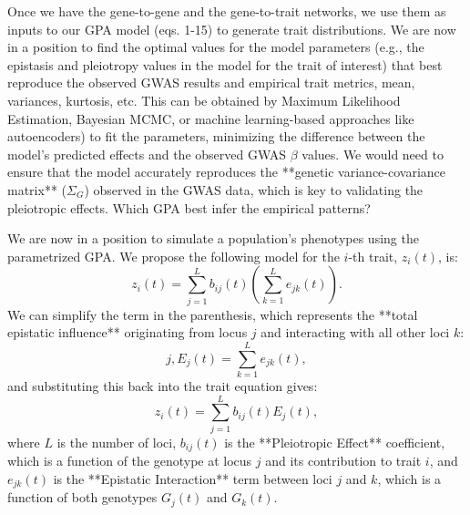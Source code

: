 \documentclass[a4paper,12pt]{elsarticle}
\begin{document}
\begin{tcolorbox}
Once we have the gene-to-gene and the gene-to-trait networks, we use them as inputs to our GPA model (eqs. 1-15) to generate trait distributions. We are now in a position to find the optimal values for the model parameters (e.g., the epistasis and pleiotropy values in the model for the trait of interest) that best reproduce the observed GWAS results and empirical trait metrics, mean, variances, kurtosis, etc. This can be obtained by Maximum Likelihood Estimation, Bayesian MCMC, or machine learning-based approaches like autoencoders) to fit the parameters, minimizing the difference between the model's predicted effects and the observed GWAS $\beta$ values. We would need to ensure that the model accurately reproduces the **genetic variance-covariance matrix** ($\Sigma_G$) observed in the GWAS data, which is key to validating the pleiotropic effects. Which GPA best infer the empirical patterns? 

We are now in a position to simulate a population's phenotypes using the parametrized GPA. We propose the following model for the $i$-th trait, $z_i(t)$, is:
\begin{equation}
z_i(t) = \sum_{j=1}^{L} b_{ij}(t) \left( \sum_{k=1}^{L} e_{jk}(t) \right).
\end{equation}
We can simplify the term in the parenthesis, which represents the **total epistatic influence** originating from locus $j$ and interacting with all other loci $k$:
\begin{equation}
j, E_j(t) = \sum_{k=1}^{L} e_{jk}(t),
\end{equation}
and substituting this back into the trait equation gives:
\begin{equation}
z_i(t) = \sum_{j=1}^{L} b_{ij}(t) E_j(t),
\end{equation}
where $L$ is the number of loci, $b_{ij}(t)$ is the **Pleiotropic Effect** coefficient, which is a function of the genotype at locus $j$ and its contribution to trait $i$, and $e_{jk}(t)$ is the **Epistatic Interaction** term between loci $j$ and $k$, which is a function of both genotypes $G_j(t)$ and $G_k(t)$.


\end{tcolorbox}
\end{document}
